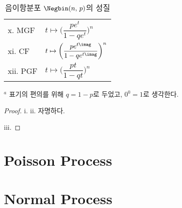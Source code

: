 \begin{table}
\begin{tabularx}{\textwidth}{XX}
    x. MGF & $t\mapsto\bigg(\dfrac{pe^t}{1-qe^t}\bigg)^n$\vspace{0.5em}\\
    xi. CF & $t\mapsto\bigg(\dfrac{pe^{t\imag}}{1-qe^{t\imag}}\bigg)^n$\vspace{0.5em}\\
    xii. PGF & $t\mapsto\bigg(\dfrac{pt}{1-qt}\bigg)^n$\vspace{0.5em}\\
    \hline
    \end{tabularx}
    \caption{음이항분포 $\Negbin(n,\,p)$의 성질\label{tb:negativeBinomialDist}}
    $^a$ 표기의 편의를 위해 $q=1-p$로 두었고, $0^0=1$로 생각한다.
\end{table}

\begin{proof}
    i. ii. 자명하다.

    iii. 
\end{proof}

\section{Poisson Process}

\section{Normal Process}